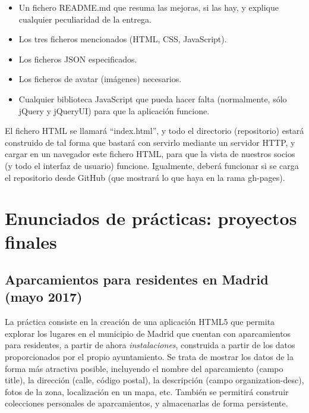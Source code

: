 \begin{itemize}
\item Un fichero README.md que resuma las mejoras, si las hay, y explique cualquier peculiaridad de la entrega.
\item Los tres ficheros mencionados (HTML, CSS, JavaScript).
\item Los ficheros JSON especificados.
\item Los ficheros de avatar (imágenes) necesarios.
\item Cualquier biblioteca JavaScript que pueda hacer falta (normalmente, sólo jQuery y jQueryUI) para que la aplicación funcione.
\end{itemize}

El fichero HTML se llamará ``index.html'', y todo el directorio (repositorio) estará construido de tal forma que bastará con servirlo mediante un servidor HTTP, y cargar en un navegador este fichero HTML, para que la vista de nuestros socios (y todo el interfaz de usuario) funcione. Igualmente, deberá funcionar si se carga el repositorio desde GitHub (que mostrará lo que haya en la rama gh-pages).


\chapter{Enunciados de prácticas: proyectos finales}

\section{Aparcamientos para residentes en Madrid (mayo 2017)}

\label{sec:final-17-mayo}

La práctica consiste en la creación de una aplicación HTML5 que permita explorar los lugares en el municipio de Madrid que cuentan con aparcamientos para residentes, a partir de ahora \emph{instalaciones}, construida a partir de los datos proporcionados por el propio ayuntamiento. Se trata de mostrar los datos de la forma más atractiva posible, incluyendo el nombre del aparcamiento (campo title), la dirección (calle, código postal), la descripción (campo organization-desc), fotos de la zona, localización en un mapa, etc. También se permitirá construir colecciones personales de aparcamientos, y almacenarlas de forma persistente.


